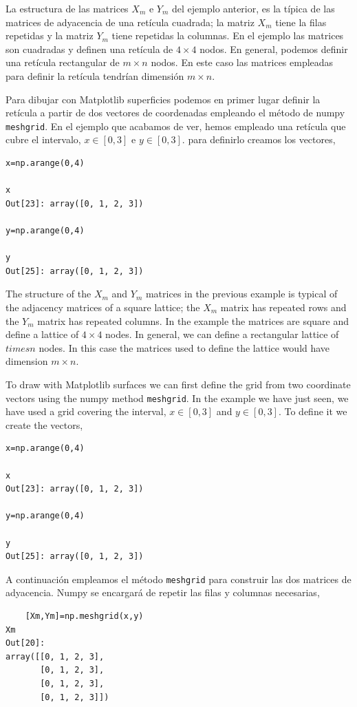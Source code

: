 \begin{paracol}{2}
La estructura de las matrices $X_m$ e $Y_m$ del ejemplo anterior, es la típica de las matrices de adyacencia de una retícula cuadrada; la matriz  $X_m$ tiene la filas repetidas y la matriz $Y_m$ tiene repetidas la columnas. En el ejemplo las matrices son cuadradas y definen una retícula de $4\times 4$ nodos. En general, podemos definir una retícula rectangular de $m\times n$ nodos. En este caso las matrices empleadas para definir la retícula tendrían dimensión $m\times n$.

Para dibujar con Matplotlib superficies podemos en primer lugar definir la retícula a partir de dos vectores de coordenadas empleando el método de numpy \texttt{meshgrid}. En el ejemplo que acabamos de ver, hemos empleado una retícula que cubre el intervalo, $x\in[0,3]$ e $y\in[0,3]$. para definirlo creamos los vectores,
\begin{verbatim}
x=np.arange(0,4)

x
Out[23]: array([0, 1, 2, 3])

y=np.arange(0,4)

y
Out[25]: array([0, 1, 2, 3])
\end{verbatim}
\switchcolumn
The structure of the $X_m$ and $Y_m$ matrices in the previous example is typical of the adjacency matrices of a square lattice; the $X_m$ matrix has repeated rows and the $Y_m$ matrix has repeated columns. In the example the matrices are square and define a lattice of $4\times 4$ nodes. In general, we can define a rectangular lattice of $times n$ nodes. In this case the matrices used to define the lattice would have dimension $m\times n$.

To draw with Matplotlib surfaces we can first define the grid from two coordinate vectors using the numpy method \texttt{meshgrid}. In the example we have just seen, we have used a grid covering the interval, $x\in[0,3]$ and $y\in[0,3]$. To define it we create the vectors,
\begin{verbatim}
x=np.arange(0,4)

x
Out[23]: array([0, 1, 2, 3])

y=np.arange(0,4)

y
Out[25]: array([0, 1, 2, 3])
\end{verbatim}
\switchcolumn
A continuación empleamos el método \texttt{meshgrid} para construir las dos matrices de adyacencia. Numpy se encargará de repetir las filas y columnas necesarias,


\begin{verbatim}
    [Xm,Ym]=np.meshgrid(x,y)
Xm
Out[20]: 
array([[0, 1, 2, 3],
       [0, 1, 2, 3],
       [0, 1, 2, 3],
       [0, 1, 2, 3]])


\end{verbatim}
\end{paracol}
